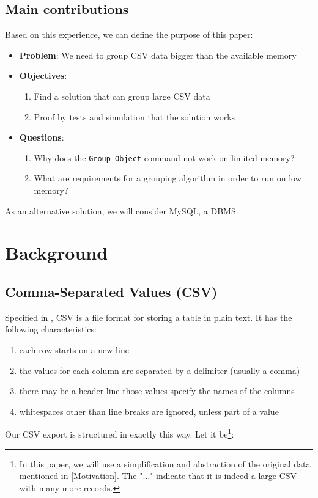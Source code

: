 \subsection{Main contributions}
Based on this experience, we can define the purpose of this paper:
\begin{itemize}
    \item \textbf{Problem}: We need to group CSV data bigger than the available memory
    \item \textbf{Objectives}:
    \begin{enumerate}
        \item Find a solution that can group large CSV data
        \item Proof by tests and simulation that the solution works
    \end{enumerate}
    \item \textbf{Questions}:
    \begin{enumerate}
        \item Why does the \verb+Group-Object+ command not work on limited memory?
        \item What are requirements for a grouping algorithm in order to run on low memory?
    \end{enumerate}
\end{itemize}
As an alternative solution, we will consider MySQL, a \gls{DBMS}.

\newpage
\section{Background}

\subsection{Comma-Separated Values (CSV)}

Specified in \cite{rfc4180}, CSV is a file format for storing a table in plain text.
It has the following characteristics:

\begin{enumerate}
    \item each row starts on a new line
    \item the values for each column are separated by a delimiter (usually a comma)
    \item there may be a header line those values specify the names of the columns
    \item whitespaces other than line breaks are ignored, unless part of a value
\end{enumerate}
Our CSV export is structured in exactly this way. Let it be\footnote{
In this paper, we will use a simplification and abstraction of the original
data mentioned in \ref{Motivation}. The "$\dots$" indicate that
it is indeed a large CSV with many more records.}:

